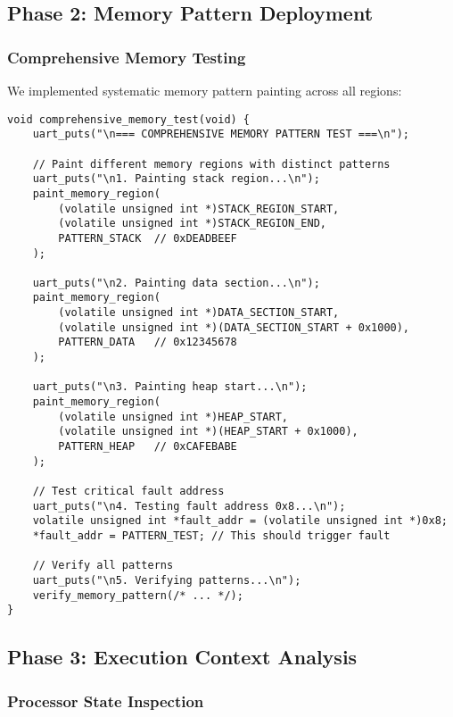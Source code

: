 \documentclass[11pt,a4paper]{article}
\begin{document}
\subsection{Phase 2: Memory Pattern Deployment}

\subsubsection{Comprehensive Memory Testing}

We implemented systematic memory pattern painting across all regions:

\begin{lstlisting}[caption={Comprehensive Memory Pattern Testing}]
void comprehensive_memory_test(void) {
    uart_puts("\n=== COMPREHENSIVE MEMORY PATTERN TEST ===\n");
    
    // Paint different memory regions with distinct patterns
    uart_puts("\n1. Painting stack region...\n");
    paint_memory_region(
        (volatile unsigned int *)STACK_REGION_START,
        (volatile unsigned int *)STACK_REGION_END,
        PATTERN_STACK  // 0xDEADBEEF
    );
    
    uart_puts("\n2. Painting data section...\n");
    paint_memory_region(
        (volatile unsigned int *)DATA_SECTION_START,
        (volatile unsigned int *)(DATA_SECTION_START + 0x1000),
        PATTERN_DATA   // 0x12345678
    );
    
    uart_puts("\n3. Painting heap start...\n");
    paint_memory_region(
        (volatile unsigned int *)HEAP_START,
        (volatile unsigned int *)(HEAP_START + 0x1000),
        PATTERN_HEAP   // 0xCAFEBABE
    );
    
    // Test critical fault address
    uart_puts("\n4. Testing fault address 0x8...\n");
    volatile unsigned int *fault_addr = (volatile unsigned int *)0x8;
    *fault_addr = PATTERN_TEST; // This should trigger fault
    
    // Verify all patterns
    uart_puts("\n5. Verifying patterns...\n");
    verify_memory_pattern(/* ... */);
}
\end{lstlisting}

\subsection{Phase 3: Execution Context Analysis}

\subsubsection{Processor State Inspection}
\end{document}
